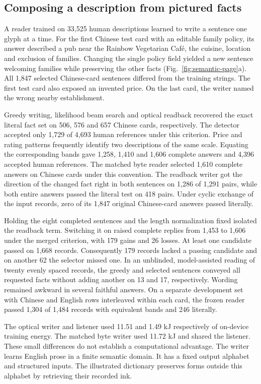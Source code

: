 \subsection*{Composing a description from pictured facts}
A reader trained on 33,525 human descriptions learned to write a sentence one glyph at a time. For the first Chinese test card with an editable family policy, its answer described a pub near the Rainbow Vegetarian Caf\'e, the cuisine, location and exclusion of families. Changing the single policy field yielded a new sentence welcoming families while preserving the other facts (Fig.~\ref{fig:semantic-page}a). All 1,847 selected Chinese-card sentences differed from the training strings. The first test card also exposed an invented price. On the last card, the writer named the wrong nearby establishment.

Greedy writing, likelihood beam search and optical readback recovered the exact literal fact set on 506, 576 and 657 Chinese cards, respectively. The detector accepted only 1,729 of 4,693 human references under this criterion. Price and rating patterns frequently identify two descriptions of the same scale. Equating the corresponding bands gave 1,258, 1,410 and 1,606 complete answers and 4,396 accepted human references. The matched byte reader selected 1,610 complete answers on Chinese cards under this convention. The readback writer got the direction of the changed fact right in both sentences on 1,286 of 1,291 pairs, while both entire answers passed the literal test on 418 pairs. Under cyclic exchange of the input records, zero of its 1,847 original Chinese-card answers passed literally.

Holding the eight completed sentences and the length normalization fixed isolated the readback term. Switching it on raised complete replies from 1,453 to 1,606 under the merged criterion, with 179 gains and 26 losses. At least one candidate passed on 1,668 records. Consequently 179 records lacked a passing candidate and on another 62 the selector missed one. In an unblinded, model-assisted reading of twenty evenly spaced records, the greedy and selected sentences conveyed all requested facts without adding another on 13 and 17, respectively. Wording remained awkward in several faithful answers. On a separate development set with Chinese and English rows interleaved within each card, the frozen reader passed 1,304 of 1,484 records with equivalent bands and 246 literally.

The optical writer and listener used 11.51 and 1.49 kJ respectively of on-device training energy. The matched byte writer used 11.72 kJ and shared the listener. These small differences do not establish a computational advantage. The writer learns English prose in a finite semantic domain. It has a fixed output alphabet and structured inputs. The illustrated dictionary preserves forms outside this alphabet by retrieving their recorded ink.
